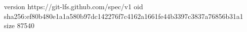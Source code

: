 version https://git-lfs.github.com/spec/v1
oid sha256:ef80b480e1a1a580b97dc142276f7c4162a1661fe44b3397c3837a76856b31a1
size 87540
